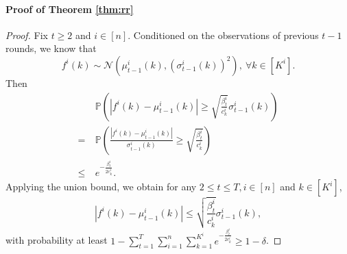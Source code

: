 \documentclass[letterpaper]{vldb}
\newcommand{\cN}{\mathcal{N}}
\newcommand{\bP}{\mathbb{P}} %
\begin{document}
\paragraph*{Proof of Theorem \ref{thm:rr}}
\begin{proof}
   Fix $t\ge 2$ and $i\in [n]$. Conditioned on the observations of previous $t-1$ rounds, we
  know that 
  \[
    f^i(k) \sim \cN(\mu^i_{t-1}(k), (\sigma^i_{t-1}(k))^2), \ \forall k\in [K^i].
  \]
  Then
  \begin{align*}
    & \bP\left(|f^i(k)- \mu^i_{t-1}(k)| \ge \sqrt{\frac{\beta^i_t}{c^i_k}}\sigma^i_{t-1}(k)\right)\\
    =\ & \bP\left(\frac{|f^i(k)- \mu^i_{t-1}(k)|}{\sigma^i_{t-1}(k)} \ge \sqrt{\frac{\beta^i_t}{c^i_k}}\right)\\
     \le\ & e^{-\frac{\beta^i_t}{2c^i_k}}.
  \end{align*}
  Applying the union bound, we obtain for any $2\le t\le T, i\in [n]$ and $k\in [K^i]$,
  \[
    |f^i(k) - \mu^i_{t-1}(k) | \le \sqrt{\frac{\beta^i_t}{c^i_k}}\sigma^i_{t-1}(k),
  \]
  with probability at least $1- \sum_{t=1}^T\sum_{i=1}^n\sum_{k=1}^{K^i}
  e^{-\frac{\beta^i_t}{2c^i_k}} \ge  1 - \delta$.


\end{proof}
\end{document}
